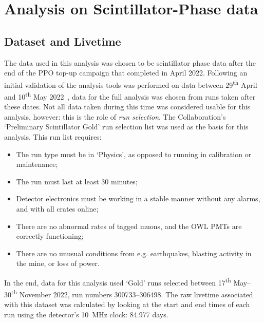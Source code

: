         

\section{Analysis on Scintillator-Phase data}\label{sec:solar_analysis_results}
\subsection{Dataset and Livetime}\label{sec:solar_dataset_livetime}
The data used in this analysis was chosen to be scintillator phase data after the end of the PPO top-up campaign that completed in April 2022. Following an initial validation of the analysis tools was performed on data between 29\textsuperscript{th} April and 10\textsuperscript{th} May 2022~\cite{cookmanSolarOscillationAnalysis2023}, %
data for the full analysis was chosen from runs taken after these dates. Not all data taken during this time was considered usable for this analysis, however: this is the role of \textit{run selection}. The Collaboration's `Preliminary Scintillator Gold' run selection list was used as the basis for this analysis. This run list requires:
\begin{itemize}
    \item The run type must be in `Physics', as opposed to running in calibration or maintenance;
    \item The run must last at least 30 minutes;
    \item Detector electronics must be working in a stable manner without any alarms, and with all crates online;
    \item There are no abnormal rates of tagged muons, and the OWL PMTs are correctly functioning;
    \item There are no unusual conditions from e.g. earthquakes, blasting activity in the mine, or loss of power. 
\end{itemize}
In the end, data for this analysis used `Gold' runs selected between 17\textsuperscript{th} May--30\textsuperscript{th} November 2022, run numbers 300733--306498. The raw livetime associated with this dataset was calculated by looking at the start and end times of each run using the detector's \SI{10}{\MHz} clock: 84.977 days.

